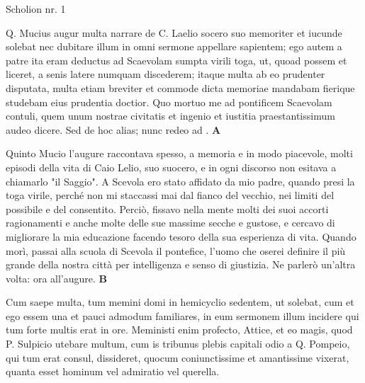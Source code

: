 \documentclass[a4paper]{book}
\begin{document}
\beginnumbering
\numberpstarttrue
{}

\pstart{}%
    Scholion nr. 1%
\pend

\pausenumbering
\begin{pairs}
\begin{Leftside}
\resumenumbering
\numberpstartfalse
    \pstart\noindent Q. Mucius augur multa narrare de C. Laelio socero suo memoriter et iucunde solebat nec dubitare illum in omni sermone appellare sapientem; ego autem a patre ita eram deductus ad Scaevolam sumpta virili toga, ut, quoad possem et liceret, a senis latere numquam discederem; itaque multa ab eo prudenter disputata, multa etiam breviter et commode dicta memoriae mandabam fierique studebam eius prudentia doctior. Quo mortuo me ad pontificem Scaevolam contuli, quem unum nostrae civitatis et ingenio et iustitia praestantissimum audeo dicere. Sed de hoc alias; nunc redeo ad . \textbf{A}\pend
\pausenumbering
\end{Leftside}

\begin{Rightside}
\beginnumbering
\numberpstartfalse
    \pstart\noindent Quinto Mucio l'augure raccontava spesso, a memoria e in modo piacevole, molti episodi della vita di Caio Lelio, suo suocero, e in ogni discorso non esitava a chiamarlo "il Saggio". A Scevola ero stato affidato da mio padre, quando presi la toga virile, perché non mi staccassi mai dal fianco del vecchio, nei limiti del possibile e del consentito. Perciò, fissavo nella mente molti dei suoi accorti ragionamenti e anche molte delle sue massime secche e gustose, e cercavo di migliorare la mia educazione facendo tesoro della sua esperienza di vita. Quando morì, passai alla scuola di Scevola il pontefice, l'uomo che oserei definire il più grande della nostra città per intelligenza e senso di giustizia. Ne parlerò un'altra volta: ora  all'augure. \textbf{B}\pend{}
\pausenumbering
\end{Rightside}
\end{pairs}
\Columns

\numberpstarttrue
\resumenumbering
\pstart%
    Cum saepe multa, tum memini domi in hemicyclio sedentem, ut solebat, cum et ego essem una et pauci admodum familiares, in eum sermonem illum incidere qui tum forte multis erat in ore. Meministi enim profecto, Attice, et eo magis, quod P. Sulpicio utebare multum, cum is tribunus plebis capitali odio a Q. Pompeio, qui tum erat consul, dissideret, quocum coniunctissime et amantissime vixerat, quanta esset hominum vel admiratio vel querella.%
\pend
\end{document}
